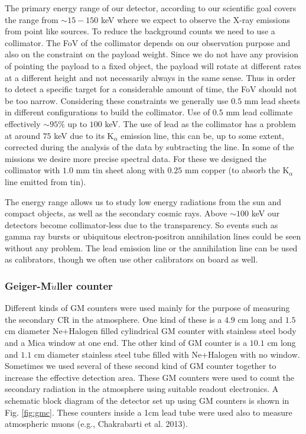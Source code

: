 The primary energy range of our detector, according to our scientific goal covers the
range from $\sim 15-150$ keV where we expect to observe the X-ray emissions from 
point like sources. To reduce the background counts we need to
use a collimator. The FoV of the collimator depends on our observation
purpose and also on the constraint on the payload weight. 
Since we do not have any provision of pointing the payload to a fixed object, 
the payload will rotate at different rates at a different height and
not necessarily always in the same sense. Thus in order to detect a specific target
for a considerable amount of time, the FoV should not be too narrow.
Considering these constraints we generally use $0.5$ mm lead sheets in different
configurations to build the collimator. Use of $0.5$ mm lead collimate effectively
$\sim 95\%$ up to $100$ keV. The use of lead as the collimator has a problem at
around $75$ keV due to its K$_{\alpha}$ emission line, this can be,
up to some extent, corrected during the analysis of the data by subtracting the
line. In some of the missions we desire more precise spectral data. For these we designed
the collimator with $1.0$ mm tin sheet along with $0.25$ mm copper (to absorb the
K$_{\alpha}$ line emitted from tin). 

The energy range allows us to study low energy radiations from the sun and compact objects,
as well as the secondary cosmic rays. Above $\sim 100$ keV our detectors become collimator-less
due to the transparency. So events such as gamma ray bursts or ubiquitous 
electron-positron annihilation lines could be seen without any problem. The lead emission line or the 
annihilation line can be used as calibrators, though we often use other calibrators on board as well.

\subsubsection{Geiger-M$\ddot{u}$ller counter}
\label{sssec:gmc}
Different kinds of GM counters were used mainly for the purpose of measuring the 
secondary CR in the atmosphere. One kind of these is a $4.9$ cm long and 
$1.5$ cm diameter Ne+Halogen filled cylindrical GM counter with stainless steel body and
a Mica window at one end. The other kind of GM counter is a $10.1$ cm long and 
$1.1$ cm diameter stainless steel tube filled with Ne+Halogen with no window. 
Sometimes we used several of these second kind of GM counter together to increase the 
effective detection area. These GM counters were used to count the secondary radiation
in the atmosphere using suitable readout electronics. A schematic block diagram
of the detector set up using GM counters is shown in Fig. \ref{fig:gmc}. These counters 
inside a 1cm lead tube were used also to measure atmospheric muons (e.g., Chakrabarti et al. 2013).

